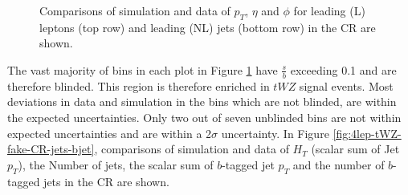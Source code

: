 \begin{figure}[htbp]
\begin{tabular}{ccc}
\end{tabular}
\caption{Comparisons of simulation and data of $p_{T}$, $\eta$ and $\phi$ for leading (L) leptons (top row) and leading (NL) jets (bottom row) in the \tWZfake CR are shown.}
\label{fig:4lep-tWZ-fake-CR-leptonPlots}
\end{figure}The vast majority of bins in each plot in Figure \ref{fig:4lep-tWZ-fake-CR-leptonPlots} have $\frac{s}{b}$ exceeding 0.1 and are therefore blinded. This region is therefore enriched in $tWZ$ signal events. Most deviations in data and simulation in the bins which are not blinded, are within the expected uncertainties. Only two out of seven unblinded bins are not within expected uncertainties and are within a 2$\sigma$ uncertainty. In Figure \ref{fig:4lep-tWZ-fake-CR-jets-bjet}, comparisons of simulation and data of $H_{T}$ (scalar sum of Jet $p_{T}$), the Number of jets, the scalar sum of $b$-tagged jet $p_{T}$ and the number of $b$-tagged jets in the \tWZfake CR are shown.
